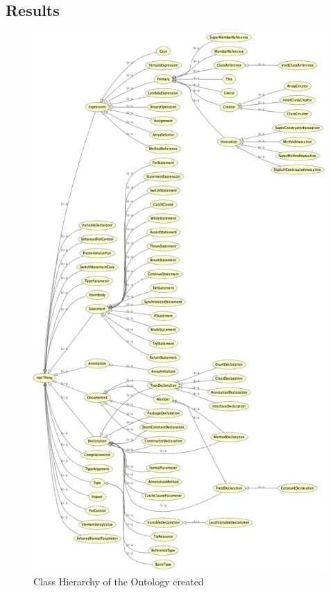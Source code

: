 \documentclass [14 pt]{article}
\begin{document}
\subsection{Results}
\begin{figure}[H]
\centering
\includegraphics[height=0.9\textheight]{res/ontology_graph.png}
\caption{Class Hierarchy of the Ontology created}\label{fig:OntoClassGraph}
\end{figure}
\end{document}
